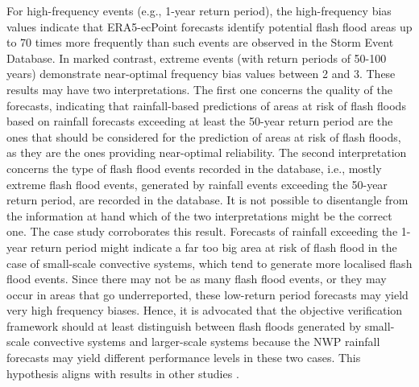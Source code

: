For  high-frequency events (e.g., 1-year return period), the high-frequency bias values indicate that ERA5-ecPoint forecasts identify potential flash flood areas up to 70 times more frequently than such events are observed in the Storm Event Database. In marked contrast, extreme events (with return periods of 50-100 years) demonstrate near-optimal frequency bias values between 2 and 3. These results may have two interpretations. The first one concerns the quality of the forecasts, indicating that rainfall-based predictions of areas at risk of flash floods based on rainfall forecasts exceeding at least the 50-year return period are the ones that should be considered for the prediction of areas at risk of flash floods, as they are the ones providing near-optimal reliability. The second interpretation concerns the type of flash flood events recorded in the database, i.e., mostly extreme flash flood events, generated by rainfall events exceeding the 50-year return period, are recorded in the database. It is not possible to disentangle from the information at hand which of the two interpretations might be the correct one. The case study corroborates this result. Forecasts of rainfall exceeding the 1-year return period might indicate a far too big area at risk of flash flood in the case of small-scale convective systems, which tend to generate more localised flash flood events. Since there may not be as many flash flood events, or they may occur in areas that go underreported, these low-return period forecasts may yield very high frequency biases. Hence, it is advocated that the objective verification framework should at least distinguish between flash floods generated by small-scale convective systems and larger-scale systems because the NWP rainfall forecasts may yield different performance levels in these two cases. This hypothesis aligns with results in other studies \citep{Pillosu_2024}.

